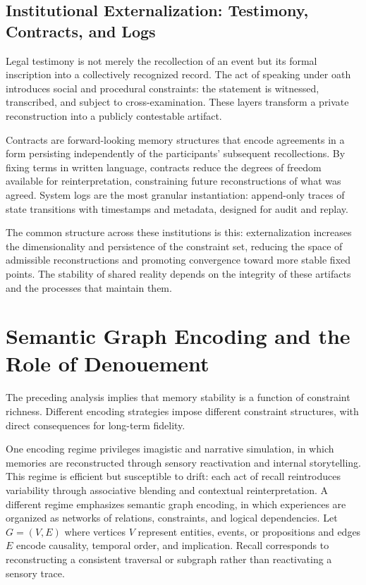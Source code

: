 \documentclass[12pt, letterpaper]{article}
\theoremstyle{flyxion}
\begin{document}
\subsection{Institutional Externalization: Testimony, Contracts, and Logs}

Legal testimony is not merely the recollection of an event but its formal inscription into a collectively recognized record. The act of speaking under oath introduces social and procedural constraints: the statement is witnessed, transcribed, and subject to cross-examination. These layers transform a private reconstruction into a publicly contestable artifact.

Contracts are forward-looking memory structures that encode agreements in a form persisting independently of the participants' subsequent recollections. By fixing terms in written language, contracts reduce the degrees of freedom available for reinterpretation, constraining future reconstructions of what was agreed. System logs are the most granular instantiation: append-only traces of state transitions with timestamps and metadata, designed for audit and replay.

The common structure across these institutions is this: externalization increases the dimensionality and persistence of the constraint set, reducing the space of admissible reconstructions and promoting convergence toward more stable fixed points. The stability of shared reality depends on the integrity of these artifacts and the processes that maintain them.

\section{Semantic Graph Encoding and the Role of Denouement}

The preceding analysis implies that memory stability is a function of constraint richness. Different encoding strategies impose different constraint structures, with direct consequences for long-term fidelity.

One encoding regime privileges imagistic and narrative simulation, in which memories are reconstructed through sensory reactivation and internal storytelling. This regime is efficient but susceptible to drift: each act of recall reintroduces variability through associative blending and contextual reinterpretation. A different regime emphasizes semantic graph encoding, in which experiences are organized as networks of relations, constraints, and logical dependencies. Let $G = (V, E)$ where vertices $V$ represent entities, events, or propositions and edges $E$ encode causality, temporal order, and implication. Recall corresponds to reconstructing a consistent traversal or subgraph rather than reactivating a sensory trace.
\end{document}

